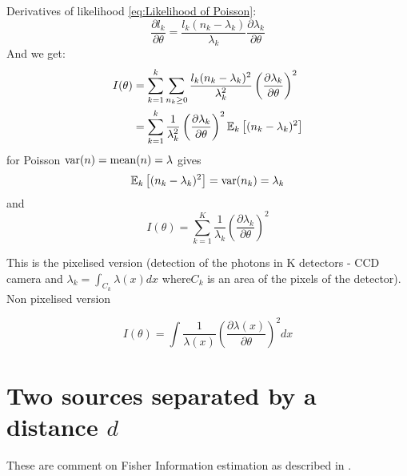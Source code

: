 Derivatives of likelihood \autoref{eq:Likelihood of Poisson}: 
%
\begin{equation}
	\frac{\partial l_k}{\partial\theta}=\frac{l_k(n_k-\lambda_k)}{\lambda_k}\frac{\partial\lambda_k}{\partial\theta}
\end{equation}
%
And we get:
%
\begin{align*}
	I(\theta) & =\sum_{k=1}^k\sum_{n_k\geq0}\frac{l_k(n_k-\lambda_k)^2}{\lambda_k^2}\left(\frac{\partial\lambda_k}{\partial\theta}\right)^2\\
	 & =\sum_{k=1}^k\frac{1}{\lambda_k^2}\left(\frac{\partial\lambda_k}{\partial\theta}\right)^2\mathbb{E}_k\left[(n_k-\lambda_k)^2\right]
\end{align*}
%
for Poisson $\mathrm{var}(n)=\mathrm{mean}(n)=\lambda$ gives 
%
\begin{equation}
	\mathbb{E}_k\left[(n_k-\lambda_k)^2\right]=\mathrm{var}(n_k)=\lambda_k
\end{equation}
%
and
% 
\begin{equation}
	I(\theta)=\sum_{k=1}^K\frac{1}{\lambda_k}\left(\frac{\partial\lambda_k}{\partial\theta}\right)^2\label{eq:Fisher Info for Poisson}
\end{equation}

This is the pixelised version (detection of the photons in K detectors - CCD camera and $\lambda_k=\int_{C_k}\lambda(x)dx$ where$C_k$ is an area of the pixels of the detector). Non pixelised version \citep{Ram2006}

\begin{equation}
	I(\theta)=\int\frac{1}{\lambda(x)}\left(\frac{\partial\lambda(x)}{\partial\theta}\right)^2dx
\end{equation}


\section{Two sources separated by a distance $d$\label{sub:Appendix Two-sources-separated}}

These are comment on Fisher Information estimation as described in \citep{Ram2006}.

